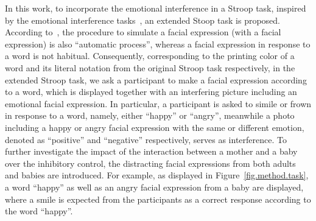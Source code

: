 In this work,
to incorporate the emotional interference in a Stroop task,
inspired by the emotional interference tasks~\citep{otte2011interference,lee2007controlling}, 
an extended Stoop task is proposed.
According to~\citep{dimberg2000unconscious,lundqvist1995facial,wild2001emotions},
the procedure to simulate a facial expression (with a facial expression)
is also ``automatic process'',
whereas a facial expression in response to a word is not habitual.
Consequently,
corresponding to the printing color of a word and its literal notation 
from the original Stroop task respectively,
in the extended Stroop task,
we ask a participant to make a facial expression according to a word, which is 
displayed together with an interfering picture including an emotional facial expression. 
In particular, a participant is asked to simile or frown 
in response to a word, namely, 
either ``happy'' or ``angry'', 
meanwhile a photo including a happy or angry facial expression with 
the same or different emotion, 
denoted as ``positive'' and ``negative'' respectively, 
serves as interference. 
To further investigate the impact of the interaction between a mother and a baby over the inhibitory control,
the distracting facial expressions from 
both adults and babies are introduced.
For example, as displayed in Figure~\ref{fig.method.task},
a word ``happy'' as well as an angry facial expression from a baby are displayed, 
where a smile is expected from the participants 
as a correct response
according to the word ``happy''.



